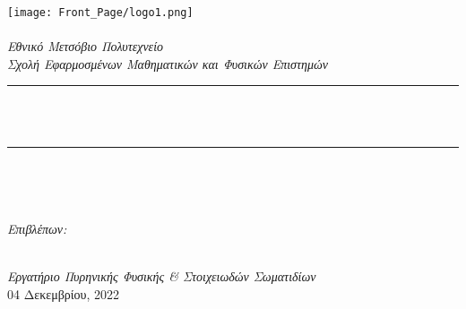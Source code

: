 \begin{titlepage}




\newcommand{\HRule}{\rule{\linewidth}{0.5mm}}
\texttt{[image: Front\_Page/logo1.png]}\\[1cm] 
\center 
\quad\\[1.5cm]
\textsl{\Large Εθνικό Μετσόβιο Πολυτεχνείο}\\[0.5cm] 
\textsl{\large Σχολή Εφαρμοσμένων Μαθηματικών και Φυσικών Επιστημών}\\[0.5cm] 
\makeatletter
\HRule \\[0.4cm]
{ \huge \bfseries \@title}\\[0.4cm] 
\HRule \\[1.5cm]
\begin{minipage}{0.4\textwidth}
\begin{flushleft} \large
\@author 
\end{flushleft}
\end{minipage}
~
\begin{minipage}{0.4\textwidth}
\begin{flushright} \large
\emph{Επιβλέπων:} \\
\end{flushright}
\end{minipage}\\[3cm]
\makeatother
{\large \emph{Εργατήριο Πυρηνικής Φυσικής \& Στοιχειωδών Σωματιδίων}}\\[0.5cm]
{\large 04 Δεκεμβρίου, 2022}
\vfill 



\end{titlepage}